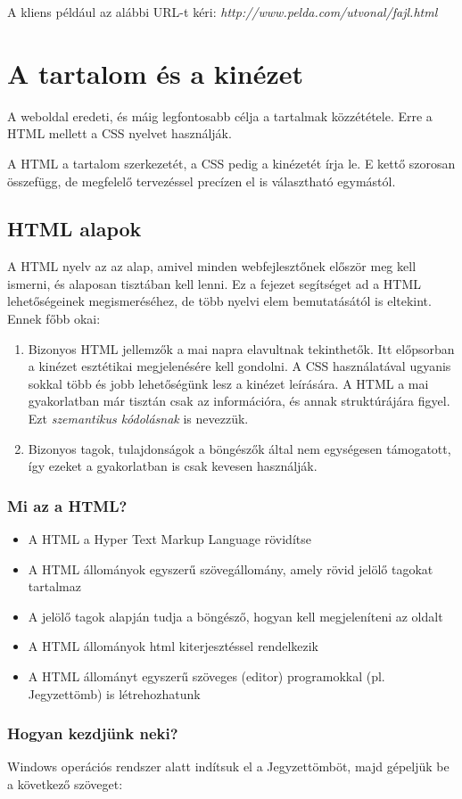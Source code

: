 \documentclass{thesis-ekf}
\theoremstyle{definition}
\begin{document}
A kliens például az alábbi URL-t kéri: \emph{http://www.pelda.com/utvonal/fajl.html}
\chapter{A tartalom és a kinézet}
A weboldal eredeti, és máig legfontosabb célja a tartalmak közzététele. Erre a HTML mellett a CSS nyelvet használják.

A HTML a tartalom szerkezetét, a CSS pedig a kinézetét írja le. E kettő szorosan összefügg, de megfelelő tervezéssel precízen el is választható egymástól.
\section{HTML alapok}
A HTML nyelv az az alap, amivel minden webfejlesztőnek először meg kell ismerni, és alaposan tisztában kell lenni. Ez a fejezet segítséget ad a HTML lehetőségeinek megismeréséhez, de több nyelvi elem bemutatásától is eltekint. Ennek főbb okai:
\begin{enumerate}
	\item Bizonyos HTML jellemzők a mai napra elavultnak tekinthetők. Itt előpsorban a kinézet esztétikai megjelenésére kell gondolni. A CSS használatával ugyanis sokkal több és jobb lehetőségünk lesz a kinézet leírására. A HTML a mai gyakorlatban már tisztán csak az információra, és annak struktúrájára figyel. Ezt \emph{szemantikus kódolásnak} is nevezzük.
	\item Bizonyos tagok, tulajdonságok a böngészők által nem egységesen támogatott, így ezeket a gyakorlatban is csak kevesen használják.
\end{enumerate}
\subsection{Mi az a HTML?}
\begin{itemize}
	\item A HTML a Hyper Text Markup Language rövidítse
	\item A HTML állományok egyszerű szövegállomány, amely rövid jelölő tagokat tartalmaz
	\item A jelölő tagok alapján tudja a böngésző, hogyan kell megjeleníteni az oldalt
	\item A HTML állományok html kiterjesztéssel rendelkezik
	\item A HTML állományt egyszerű szöveges (editor) programokkal (pl. Jegyzettömb) is létrehozhatunk
\end{itemize}
\subsection{Hogyan kezdjünk neki?}
Windows operációs rendszer alatt indítsuk el a Jegyzettömböt, majd gépeljük be a következő szöveget:
\end{document}
